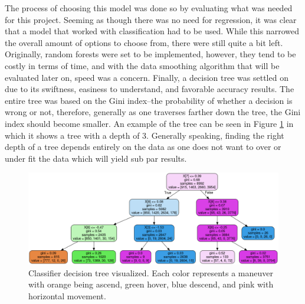 \documentclass{article}
\begin{document}
The process of choosing this model was done so by evaluating what was needed for this project. Seeming as though there was no need for regression, it was clear that a model that worked with classification had to be used. While this narrowed the overall amount of options to choose from, there were still quite a bit left. Originally, random forests were set to be implemented, however, they tend to be costly in terms of time, and with the data smoothing algorithm that will be evaluated later on, speed was a concern. Finally, a decision tree was settled on due to its swiftness, easiness to understand, and favorable accuracy results. The entire tree was based on the Gini index–the probability of whether a decision is wrong or not, therefore, generally as one traverses farther down the tree, the Gini index should become smaller. An example of the tree can be seen in Figure \ref{fig:tree} in which it shows a tree with a depth of 3. Generally speaking, finding the right depth of a tree depends entirely on the data as one does not want to over or under fit the data which will yield sub par results. \par

\begin{figure}[!h]
	\centering
	\includegraphics[scale=0.25]{images/tree}
	\caption{Classifier decision tree visualized. Each color represents a maneuver with orange being ascend, green hover, blue descend, and pink with horizontal movement.}
	\label{fig:tree}
\end{figure}
\end{document}
